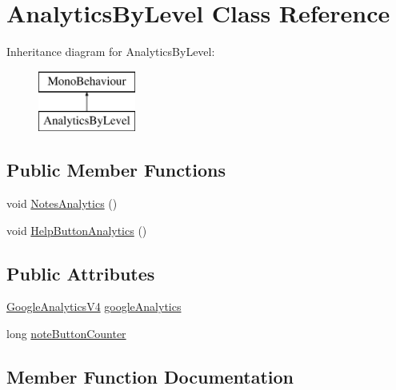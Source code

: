 \hypertarget{class_analytics_by_level}{}\section{Analytics\+By\+Level Class Reference}
\label{class_analytics_by_level}
Inheritance diagram for Analytics\+By\+Level\+:\begin{figure}[H]
\begin{center}
\leavevmode
\includegraphics[height=2.000000cm]{class_analytics_by_level}
\end{center}
\end{figure}
\subsection*{Public Member Functions}
\begin{DoxyCompactItemize}
\item 
void \hyperlink{class_analytics_by_level_aab0b06714a8b4e12b54519f312300ea9}{Notes\+Analytics} ()
\item 
void \hyperlink{class_analytics_by_level_a829e174b8aea33e2b542fb3b833f9d81}{Help\+Button\+Analytics} ()
\end{DoxyCompactItemize}
\subsection*{Public Attributes}
\begin{DoxyCompactItemize}
\item 
\hyperlink{class_google_analytics_v4}{Google\+Analytics\+V4} \hyperlink{class_analytics_by_level_af182484a1794a3a7500cc5534e018e56}{google\+Analytics}
\item 
long \hyperlink{class_analytics_by_level_a06019735d6a4d667f90fb3d88615e6af}{note\+Button\+Counter}
\end{DoxyCompactItemize}


\subsection{Member Function Documentation}
\mbox{\label{class_analytics_by_level_a829e174b8aea33e2b542fb3b833f9d81}} 
